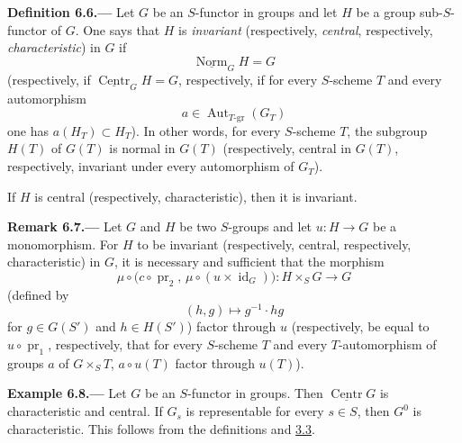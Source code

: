 
\medskip
{}\label{def:sga3-VIB-6.6}%
\noindent\textbf{Definition 6.6.---}
Let \(G\) be an \(S\)-functor in groups and let \(H\) be a group
sub-\(S\)-functor of \(G\). One says that \(H\) is \emph{invariant}
(respectively, \emph{central}, respectively,
\emph{characteristic}) in \(G\) if
\[
  \underline{\operatorname{Norm}}_G H=G
\]
(respectively, if
\(\underline{\operatorname{Centr}}_G H=G\), respectively, if for
every \(S\)-scheme \(T\) and every automorphism
\[
  a\in\operatorname{Aut}_{T\text{-}\mathrm{gr}}(G_T)
\]
one has \(a(H_T)\subset H_T\)). In other words, for every
\(S\)-scheme \(T\), the subgroup \(H(T)\) of \(G(T)\) is normal
in \(G(T)\) (respectively, central in \(G(T)\), respectively,
invariant under every automorphism of \(G_T\)).

If \(H\) is central (respectively, characteristic), then it is
invariant.

\medskip
{}\label{rem:sga3-VIB-6.7}%
\noindent\textbf{Remark 6.7.---}
Let \(G\) and \(H\) be two \(S\)-groups and let \(u:H\to G\) be
a monomorphism. For \(H\) to be invariant (respectively,
central, respectively, characteristic) in \(G\), it is necessary and
sufficient that the morphism
\[
  \mu\circ
  \bigl(c\circ\operatorname{pr}_2,\,
        \mu\circ(u\times\operatorname{id}_G)\bigr)
  :H\times_S G\longrightarrow G
\]
(defined by
\[
  (h,g)\longmapsto g^{-1}\cdot hg
\]
for \(g\in G(S')\) and \(h\in H(S')\)) factor through \(u\)
(respectively, be equal to \(u\circ\operatorname{pr}_1\), respectively,
that for every \(S\)-scheme \(T\) and every \(T\)-automorphism of groups
\(a\) of \(G\times_ST\), \(a\circ u(T)\) factor through \(u(T)\)).

\medskip
{}\label{ex:sga3-VIB-6.8}%
\noindent\textbf{Example 6.8.---}
Let \(G\) be an \(S\)-functor in groups. Then
\(\underline{\operatorname{Centr}}G\) is characteristic and
central. If \(G_s\) is representable for every \(s\in S\), then
\(G^0\) is characteristic. This follows from the definitions and
\hyperref[prop:sga3-VIB-3.3]{3.3}.

